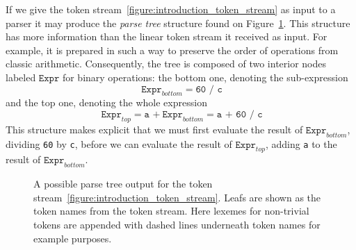 \documentclass[
  oneside,
  english,
  coorientadorbanca,
  noabntexcite
]{ufsc-thesis-rn46-2019}
\newcommand{\code}[1]{\texttt{#1}}
\newcommand{\bnfvar}[1]{\ \bnfvars{#1}}
\newcommand{\bnfvars}[1]{\code{#1}}
\newcommand{\bnfters}[1]{\textrm{`}\code{#1}\textrm{'}}
\begin{document}
If we give the token stream~\eqref{figure:introduction_token_stream} as input to a parser it may produce the \textit{parse tree} structure found on Figure~\ref{figure:introduction_ast}.
This structure has more information than the linear token stream it received as input.
For example, it is prepared in such a way to preserve the order of operations from classic arithmetic.
Consequently, the tree is composed of two interior nodes labeled $\bnfvars{Expr}$ for binary operations: the bottom one, denoting the sub-expression
\begin{equation*}
  \bnfvar{Expr}_{bottom} = \code{60 / c}
\end{equation*}
and the top one, denoting the whole expression
\begin{equation*}
  \bnfvar{Expr}_{top} = \code{a +} \bnfvar{Expr}_{bottom} = \code{a + 60 / c}
\end{equation*}
This structure makes explicit that we must first evaluate the result of $\bnfvars{Expr}_{bottom}$, dividing \code{60} by \code{c}, before we can evaluate the result of $\bnfvars{Expr}_{top}$, adding \code{a} to the result of $\bnfvars{Expr}_{bottom}$.

\begin{figure}[ht]
  \centering
  \caption{
    A possible parse tree output for the token stream~\eqref{figure:introduction_token_stream}.
    Leafs are shown as the token names from the token stream.
    Here lexemes for non-trivial tokens are appended with dashed lines underneath token names for example purposes.
  }\label{figure:introduction_ast}
\end{figure}
\end{document}
